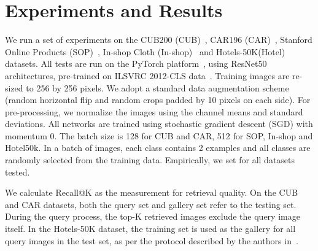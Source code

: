 \documentclass[runningheads]{llncs}
\begin{document}
\section{Experiments and Results}
\label{sec:experiments}
We run a set of experiments on the CUB200 (CUB)~\cite{CUB200}, CAR196 (CAR)~\cite{CAR196}, Stanford Online Products (SOP)~\cite{SOP}, In-shop Cloth (In-shop)~\cite{ICR} and Hotels-50K(Hotel)~\cite{hotels50k} datasets. All tests are run on the PyTorch platform~\cite{pytorch}, using ResNet50~\cite{resnet} architectures, pre-trained on ILSVRC 2012-CLS data~\cite{ILSVRC15}. Training images are re-sized to 256 by 256 pixels. We adopt a standard data augmentation scheme (random horizontal flip and random crops padded by 10 pixels on each side). For pre-processing, we normalize the images using the channel means and standard deviations. All networks are trained using stochastic gradient descent (SGD) with momentum 0. The batch size is 128 for CUB and CAR, 512 for SOP, In-shop and Hotel50k. In a batch of images, each class contains 2 examples and all classes are randomly selected from the training data. Empirically, we set  for all datasets tested.

We calculate Recall@K as the measurement for retrieval quality. On the CUB and CAR datasets, both the query set and gallery set refer to the testing set. During the query process, the top-K retrieved images exclude the query image itself. In the Hotels-50K dataset, the training set is used as the gallery for all query images in the test set, as per the protocol described by the authors in~\cite{hotels50k}.
\end{document}
